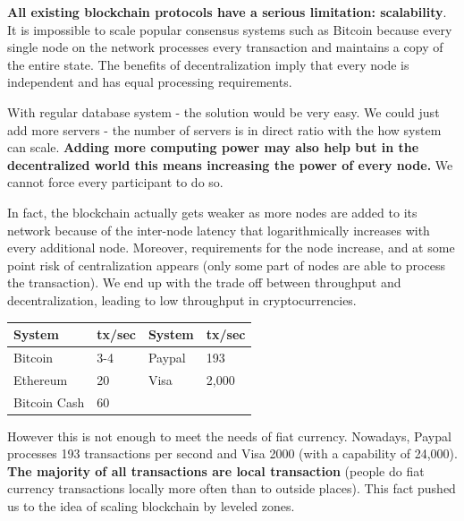 \documentclass[portrait,ansidpaper,fontscale=0.445]{baposter} %
\begin{document}
\begin{poster}
{    \textbf{All existing blockchain protocols have a serious limitation: scalability}. It is
impossible to scale popular consensus systems such as Bitcoin because every
single node on the network processes every transaction and maintains a copy of
the entire state. The benefits of decentralization imply that every node is
independent and has equal processing requirements.

\vspace{0.5em}
With regular database system - the solution would be very
easy. We could just add more servers - the number of servers is in direct ratio
with the how system can scale. \textbf{Adding more computing power may also help but in
the decentralized world this means increasing the power of every node.}  We
cannot force every participant to do so.

\vspace{0.5em}
In fact, the blockchain actually gets weaker as more nodes are added to its
network because of the inter-node latency that logarithmically increases with
every additional node. Moreover, requirements for the node increase, and at
some point risk of centralization appears (only some part of nodes are able to
process the transaction). We end up with the trade off between throughput and
decentralization, leading to low throughput in cryptocurrencies.

\vspace{-0.5em}
\begin{center}
\begin{tabular}{l l | l l}
\textbf{System} & \textbf{tx/sec} & \textbf{System} & \textbf{tx/sec} \\
\midrule
Bitcoin & 3-4 &        Paypal &  193 \\
Ethereum & 20 &        Visa & 2,000 \\
Bitcoin Cash & 60 &          &       \\


\end{tabular}
\end{center}


\vspace{-0.5em}
However this is not enough to meet the needs of fiat currency.  Nowadays,
Paypal processes 193 transactions per second and Visa 2000 (with a
capability of 24,000). \textbf{The majority of all transactions are local transaction}
(people do fiat currency transactions locally more often than to outside
places). This fact pushed us to the idea of scaling blockchain by leveled
zones.

}
\end{poster}
\end{document}
